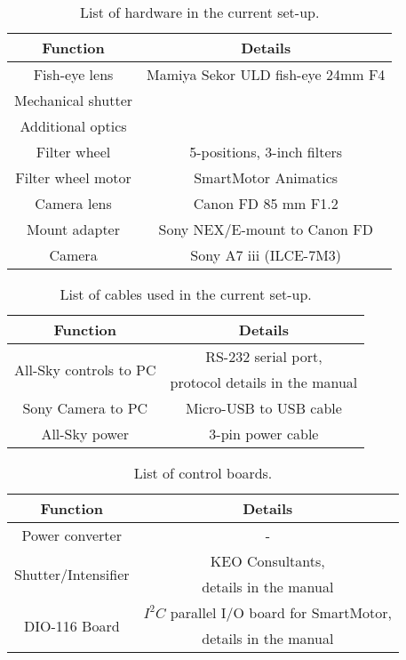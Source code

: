 \documentclass[]{book}
\begin{document}
	\begin{table} [ht]
		\caption{List of hardware in the current set-up.}
		\label{tab: list of new hardware}
		\begin{tabular}{ |c|c| } \hline
			\textbf{Function} & \textbf{Details} \\ \hline
			Fish-eye lens & Mamiya Sekor ULD fish-eye 24mm F4\\ \hline
			Mechanical shutter & \\ \hline
			Additional optics & \\ \hline
			Filter wheel & 5-positions, 3-inch filters \\ \hline
			Filter wheel motor & SmartMotor Animatics \\ \hline
			Camera lens & Canon FD 85 mm F1.2 \\ \hline
			Mount adapter & Sony NEX/E-mount to Canon FD \\ \hline
			Camera & Sony A7 iii (ILCE-7M3) \\
			\hline
		\end{tabular}
	\end{table}

	\begin{table} [ht]
		\caption{List of cables used in the current set-up.}
		\label{tab: list of wires}
		\begin{tabular}{ |c|c| } \hline
			\textbf{Function} & \textbf{Details} \\ \hline
			\multirow{2}{*}{All-Sky controls to PC} & RS-232 serial port, \\
			& protocol details in the manual \\ \hline
			Sony Camera to PC & Micro-USB to USB cable\\ \hline
			All-Sky power & 3-pin power cable\\ \hline
		\end{tabular}
	\end{table}
	
	\begin{table} [ht]
		\caption{List of control boards.}
		\label{tab: list of electronics}
		\begin{tabular}{ |c|c| } \hline
			\textbf{Function} & \textbf{Details} \\ \hline
			Power converter & - \\ \hline
			\multirow{2}{*}{Shutter/Intensifier} & KEO Consultants, \\
			Control Board & details in the manual \\ \hline
			\multirow{2}{*}{DIO-116 Board} & $ I^2C $ parallel I/O board for SmartMotor, \\
			& details in the manual \\ \hline
		\end{tabular}
	\end{table}
\end{document}
